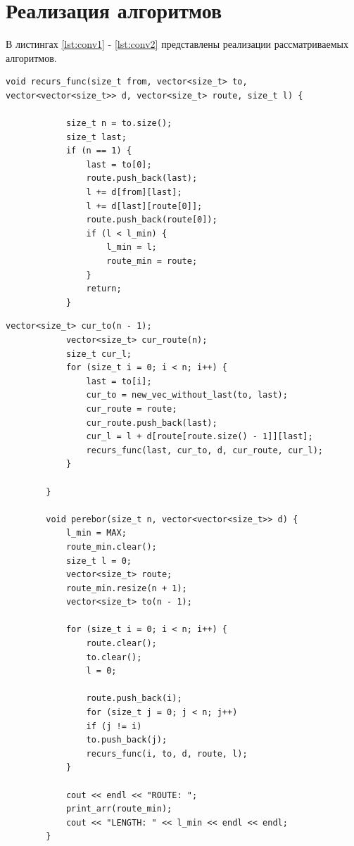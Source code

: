 \documentclass[12pt]{report}
\begin{document}
	\section{Реализация алгоритмов}
	В листингах \ref{lst:conv1} - \ref{lst:conv2} представлены реализации рассматриваемых алгоритмов.
	\captionsetup{singlelinecheck=false, justification=raggedright}
	\begin{lstlisting}[label={lst:conv1},caption=Реализация алгоритма полного перебора (часть 1)]
		void recurs_func(size_t from, vector<size_t> to, vector<vector<size_t>> d, vector<size_t> route, size_t l) {
			
			size_t n = to.size();
			size_t last;
			if (n == 1) {
				last = to[0];
				route.push_back(last);
				l += d[from][last];
				l += d[last][route[0]];
				route.push_back(route[0]);
				if (l < l_min) {
					l_min = l;
					route_min = route;
				}
				return;
			}
		\end{lstlisting}
		\newpage
		\begin{lstlisting}[caption=Реализация алгоритма полного перебора (часть 2)]
			vector<size_t> cur_to(n - 1);
			vector<size_t> cur_route(n);
			size_t cur_l;
			for (size_t i = 0; i < n; i++) {
				last = to[i];
				cur_to = new_vec_without_last(to, last);
				cur_route = route;
				cur_route.push_back(last);
				cur_l = l + d[route[route.size() - 1]][last];
				recurs_func(last, cur_to, d, cur_route, cur_l);
			}
			
		}
		
		void perebor(size_t n, vector<vector<size_t>> d) {
			l_min = MAX;
			route_min.clear();
			size_t l = 0;
			vector<size_t> route;
			route_min.resize(n + 1);
			vector<size_t> to(n - 1);
			
			for (size_t i = 0; i < n; i++) {
				route.clear();
				to.clear();
				l = 0;
				
				route.push_back(i);
				for (size_t j = 0; j < n; j++)
				if (j != i)
				to.push_back(j);
				recurs_func(i, to, d, route, l);
			}
			
			cout << endl << "ROUTE: ";
			print_arr(route_min);
			cout << "LENGTH: " << l_min << endl << endl;
		}
	\end{lstlisting}
	\newpage
\end{document}
